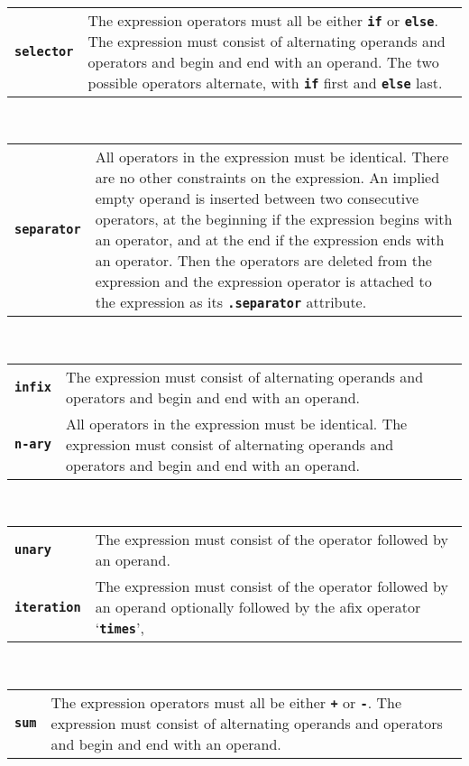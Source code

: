 \documentclass[12pt]{article}
\newcommand{\TT}[1]{{\tt \bfseries #1}}
\newcommand{\ttkey}[1]{{\tt \bfseries #1}}
\begin{document}
\begin{center}
\\[0.5ex]
\begin{tabular}{p{1in}p{5.0in}}
\ttkey{selector}
    & The expression operators must all be either \TT{if} or \TT{else}.
      The expression must consist of alternating operands
      and operators and begin and end with an operand.
      The two possible operators alternate, with \TT{if} first
      and \TT{else} last.
\end{tabular}
\\[0.5ex]
\begin{tabular}{p{1in}p{5.0in}}
\ttkey{separator}\label{SEPARATOR-FORMAT}
    & All operators in the expression must be identical.
      There are no other constraints on the expression.  An implied empty
      operand is inserted between two consecutive operators,
      at the beginning if the expression begins with an operator,
      and at the end if the expression ends with an operator.
      Then the operators are deleted from the expression and
      the expression operator is attached
      to the expression as its \TT{.separator} attribute.
\end{tabular}
\\[0.5ex]
\begin{tabular}{p{1in}p{5.0in}}
\ttkey{infix}
    & The expression must consist of alternating operands
      and operators and begin and end with an operand.
\\[1ex]
\ttkey{n-ary}
    & All operators in the expression must be identical.
      The expression must consist of alternating operands
      and operators and begin and end with an operand.
\end{tabular}
\\[0.5ex]
\begin{tabular}{p{1in}p{5.0in}}
\ttkey{unary}
    & The expression must consist of
      the operator followed by an operand.
\\[1ex]
\ttkey{iteration}
    & The expression must consist of
      the operator followed by an operand optionally followed
      by the afix operator `\TT{times}',
\end{tabular}
\\[0.5ex]
\begin{tabular}{p{1in}p{5.0in}}
\ttkey{sum}
    & The expression operators must all be either \TT{+} or \TT{-}.
      The expression must consist of alternating operands
      and operators and begin and end with an operand.
\end{tabular}
\end{center}
\end{document}
